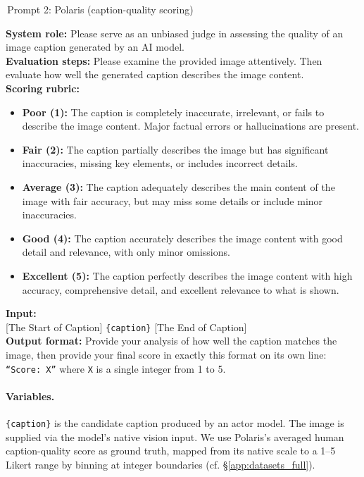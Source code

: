 \documentclass{article}
\newenvironment{promptbox}[1][Prompt]{%
  \par\medskip
  \noindent\colorbox{promptframe}{\color{white}\bfseries\small\strut\,#1\,}\par
  \vspace{-0.55\baselineskip}
  \colorlet{shadecolor}{promptbg}%
  \begin{shaded}\noindent\ignorespaces
}{%
  \end{shaded}\medskip
}
\begin{document}
\begin{promptbox}[Prompt 2: Polaris (caption-quality scoring)]
\small
\textbf{System role:} Please serve as an unbiased judge in assessing the quality of an image caption generated by an AI model.\\[2pt]

\textbf{Evaluation steps:} Please examine the provided image attentively. Then evaluate how well the generated caption describes the image content.\\[2pt]

\textbf{Scoring rubric:}
\begin{itemize}[leftmargin=14pt,itemsep=1pt,topsep=2pt]
\item \textbf{Poor (1):} The caption is completely inaccurate, irrelevant, or fails to describe the image content. Major factual errors or hallucinations are present.
\item \textbf{Fair (2):} The caption partially describes the image but has significant inaccuracies, missing key elements, or includes incorrect details.
\item \textbf{Average (3):} The caption adequately describes the main content of the image with fair accuracy, but may miss some details or include minor inaccuracies.
\item \textbf{Good (4):} The caption accurately describes the image content with good detail and relevance, with only minor omissions.
\item \textbf{Excellent (5):} The caption perfectly describes the image content with high accuracy, comprehensive detail, and excellent relevance to what is shown.
\end{itemize}

\textbf{Input:}\\
{[}The Start of Caption{]} \texttt{\{caption\}} {[}The End of Caption{]}\\[2pt]

\textbf{Output format:} Provide your analysis of how well the caption matches the image, then provide your final score in exactly this format on its own line: \texttt{``Score: X''} where \texttt{X} is a single integer from 1 to 5.
\end{promptbox}

\paragraph{Variables.} \texttt{\{caption\}} is the candidate caption produced by an actor model. The image is supplied via the model's native vision input. We use Polaris's averaged human caption-quality score as ground truth, mapped from its native scale to a 1--5 Likert range by binning at integer boundaries (cf. \S\ref{app:datasets_full}).
\end{document}
